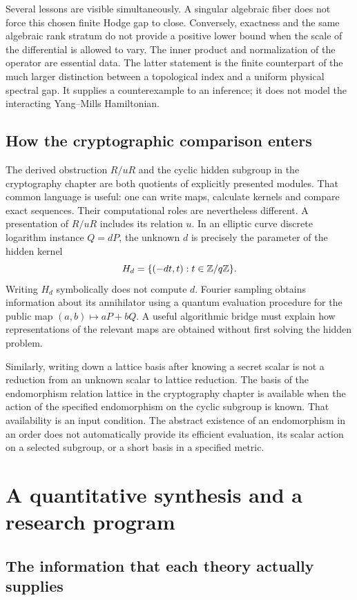 Several lessons are visible simultaneously. A singular algebraic fiber does
not force this chosen finite Hodge gap to close. Conversely, exactness and
the same algebraic rank stratum do not provide a positive lower bound when
the scale of the differential is allowed to vary. The inner product and
normalization of the operator are essential data. The latter statement is
the finite counterpart of the much larger distinction between a topological
index and a uniform physical spectral gap. It supplies a counterexample to
an inference; it does not model the interacting Yang--Mills Hamiltonian.

\section{How the cryptographic comparison enters}

The derived obstruction $R/uR$ and the cyclic hidden subgroup in the
cryptography chapter are both quotients of explicitly presented modules.
That common language is useful: one can write maps, calculate kernels and
compare exact sequences. Their computational roles are nevertheless
different. A presentation of $R/uR$ includes its relation $u$. In an elliptic
curve discrete logarithm instance $Q=dP$, the unknown $d$ is precisely the
parameter of the hidden kernel
\[
 H_d=\{(-dt,t):t\in\mathbb{Z}/q\mathbb{Z}\}.
\]
Writing $H_d$ symbolically does not compute $d$. Fourier sampling obtains
information about its annihilator using a quantum evaluation procedure for
the public map $(a,b)\mapsto aP+bQ$. A useful algorithmic bridge must explain
how representations of the relevant maps are obtained without first solving
the hidden problem.

Similarly, writing down a lattice basis after knowing a secret scalar is not
a reduction from an unknown scalar to lattice reduction. The basis of the
endomorphism relation lattice in the cryptography chapter is available when
the action of the specified endomorphism on the cyclic subgroup is known.
That availability is an input condition. The abstract existence of an
endomorphism in an order does not automatically provide its efficient
evaluation, its scalar action on a selected subgroup, or a short basis in a
specified metric.

\chapter{A quantitative synthesis and a research program}

\section{The information that each theory actually supplies}

